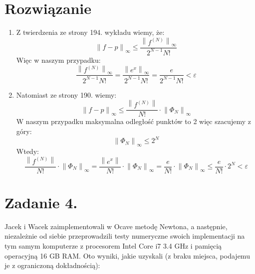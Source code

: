 \documentclass[a4paper]{article}
\renewcommand{\le}{\leqslant} %
\newcommand{\eps}{\varepsilon} %
\begin{document}
   \section*{\large Rozwiązanie}

   \begin{enumerate}[label=(\alph*)]
      \item
      Z twierdzenia ze strony 194. wykładu wiemy, że:
      \[
         \left\| f - p \right\|_{\infty} \le \frac{\left\| f^{(N)}\right\|_{\infty}}{2^{N-1} N!}
      \]
      Więc w naszym przypadku:
      \[
         \frac{\left\| f^{(N)}\right\|_{\infty}}{2^{N-1} N!} =
         \frac{\left\| e^{x} \right\|_{\infty}}{2^{N-1} N!} =
         \frac{e}{2^{N-1} N!} < \eps
      \]

      \item
      Natomiast ze strony 190. wiemy:
      \[
         \left\| f - p \right\|_{\infty} \le
         \frac{\left\| f^{(N)} \right\|}{N!} \cdot \left\| \Phi_{N} \right\|_{\infty}
      \]
      W naszym przypadku maksymalna odległość punktów to 2 więc szacujemy z góry:
      \[
         \left\| \Phi_{N} \right\|_{\infty} \le 2^{N}
      \]
      Wtedy:
      \[
         \frac{\left\| f^{(N)} \right\|}{N!} \cdot \left\| \Phi_{N} \right\|_{\infty} =
         \frac{\left\| e^{x} \right\|}{N!} \cdot \left\| \Phi_{N} \right\|_{\infty} =
         \frac{e}{N!} \cdot \left\| \Phi_{N} \right\|_{\infty} \le
         \frac{e}{N!} \cdot 2^{N} < \eps
      \]
   \end{enumerate}


   \section*{Zadanie 4.}

   Jacek i Wacek zaimplementowali w Ocave metodę Newtona, a następnie,
   niezależnie od siebie przeprowadzili testy numeryczne swoich implementacji
   na tym samym komputerze z procesorem Intel Core i7 3.4 GHz i pamięcią operacyjną 16 GB RAM.
   Oto wyniki, jakie uzyskali (z braku miejsca, podajemu je z ograniczoną dokładnością):
\end{document}
